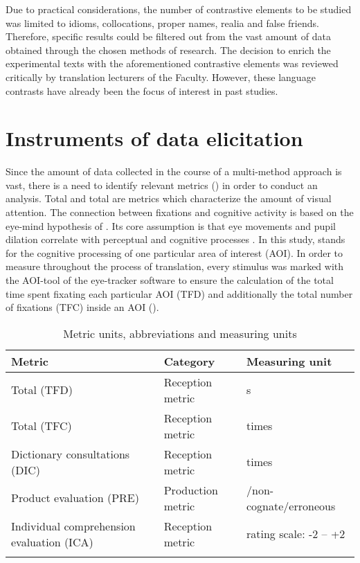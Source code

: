 \documentclass[output=paper]{langsci/langscibook.cls}
\begin{document}
Due to practical considerations, the number of contrastive elements to be studied was limited to idioms, collocations, proper names, realia and false friends. Therefore, specific results could be filtered out from the vast amount of  data obtained through the chosen methods of research. The decision to enrich the experimental texts with the aforementioned contrastive elements was reviewed critically by translation lecturers of the Faculty. However, these language contrasts have already been the focus of interest in past studies. 

\section{Instruments of data elicitation}

Since the amount of data collected in the course of a multi-method approach is vast, there is a need to identify relevant metrics () in order to conduct an analysis. Total  and total  are metrics which characterize the amount of visual attention. The connection between fixations and cognitive activity is based on the eye-mind hypothesis of \citet{Just1980}. Its core assumption is that eye movements and pupil dilation correlate with perceptual and cognitive processes \citep[173]{Gopferich2009Process}. In this study,  stands for the cognitive processing of one particular area of interest (AOI). In order to measure  throughout the process of translation, every stimulus was marked with the AOI-tool of the eye-tracker software to ensure the calculation of the total time spent fixating each particular AOI (TFD) and additionally the total number of fixations (TFC) inside an AOI (). 

\begin{table}
 \caption{Metric units, abbreviations and measuring units}
 \label{kloster:tab:1}
\begin{tabularx}{\textwidth}{Qll}
\lsptoprule
Metric & Category & Measuring unit \\
\midrule
Total  (TFD) & Reception metric & s \\
Total  (TFC) & Reception metric & times \\
Dictionary consultations (DIC) & Reception metric & times \\
Product evaluation (PRE) & Production metric & \slash non-cog\-nate\slash erroneous \\
Individual comprehension evaluation (ICA) & Reception metric & rating scale: -2 -- +2 \\
\lspbottomrule
\end{tabularx}
\end{table}
\end{document}
